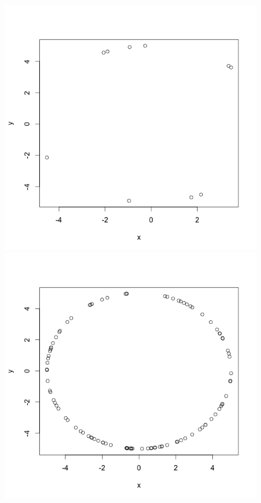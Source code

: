 \documentclass[12pt]{article}
\begin{document}
\begin{figure}[!htb]
    \includegraphics[width=0.85\linewidth]{circle10.png}
  \endminipage\hfill
    \includegraphics[width=0.85\linewidth]{circle100.png}
  \endminipage\hfill

\end{figure}
\end{document}

